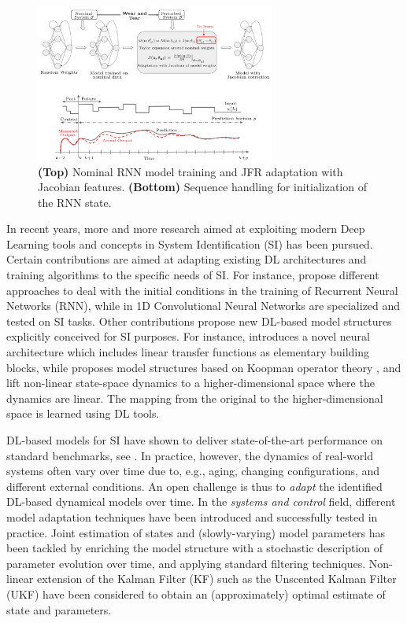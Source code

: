 \documentclass{article}
\begin{document}
\begin{figure}[bt]
    \centering
    \includegraphics[width=0.70\textwidth]{figures/RNN_overview.png}
    \caption{\textbf{(Top)} Nominal RNN model training and JFR adaptation with Jacobian features. \textbf{(Bottom)} Sequence handling for initialization of the RNN state.} 
    \label{fig:RNN-overview}
\end{figure}




In recent years, more and more research aimed at exploiting modern Deep Learning tools and concepts in System Identification (SI) has been pursued. Certain contributions are aimed at adapting existing DL architectures and training algorithms to the specific needs of SI. For instance, \cite{beintema2021nonlinear, forgione2021continuous} propose different approaches to  deal with the initial conditions in the training of Recurrent Neural Networks (RNN), while in \cite{andersson2019deep} 1D Convolutional Neural Networks are specialized and tested on SI tasks. Other contributions propose new DL-based model structures explicitly conceived for SI purposes. 
For instance, \cite{forgione2021dynonet} introduces a novel neural architecture which includes linear transfer
functions as elementary building blocks, while \cite{iacob2021deep} proposes model structures based on Koopman operator theory \cite{mauroy2020koopman}, and  lift non-linear state-space dynamics to a higher-dimensional space where the dynamics are linear. The mapping from the original to the higher-dimensional space is learned using DL tools.

DL-based models for SI have shown to deliver state-of-the-art performance on standard benchmarks, see \cite{iacob2021deep, mavkov2020integrated}.
In practice, however, the dynamics of real-world systems often vary over time due to, e.g., aging, changing configurations, and different external conditions. 
An open challenge is thus to \emph{adapt} the identified DL-based dynamical models over time.
In the \emph{systems and control} field, different model adaptation techniques have been introduced and successfully tested in practice. 
Joint estimation of states and (slowly-varying) model 
parameters has been tackled by enriching the model structure with a stochastic description of parameter evolution over time, and applying standard filtering techniques. Non-linear extension of the Kalman Filter (KF) such as the Unscented Kalman Filter (UKF)  \cite{pozzoli2020tustin} have been considered to obtain an (approximately) optimal estimate of state and parameters.
\end{document}
